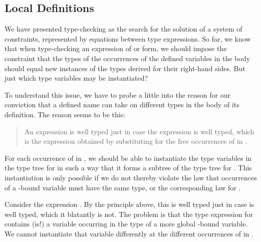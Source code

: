 \subsection{Local Definitions}

We have presented type-checking as the search for the solution of a system of
constraints, represented by equations  between type expressions. So
far, we know that when type-checking an expression of  or  form, we
should impose the constraint that the types of the occurrences of the defined
variables in the body should equal new instances of the types derived for their
right-hand sides. But just which type variables may be instantiated?

To understand this issue, we have to probe a little into the reason for our
conviction that a defined name can take on different types in the body of its
definition. The reason seems to be this:
\begin{quote}
An expression  is well typed just in case the expression
 is well typed, which is the expression obtained by substituting  for
the free occurrences of  in .
\end{quote}
For each occurrence of  in , we should be able to instantiate the type
variables in the type tree for  in such a way that it forms a subtree of the type
tree for . This instantiation is only possible if we do not thereby violate
the law that occurrences of a \ml{\tl}-bound variable must have the same type, or the
corresponding law for .

Consider the expression . By the principle above, this
is well typed just in case  is well typed, which it blatantly is not. The
problem is that the type expression for  contains (is!) a variable occurring in
the type of a more global \ml{\tl}-bound variable. We cannot instantiate that
variable differently at the different occurrences of  in .

